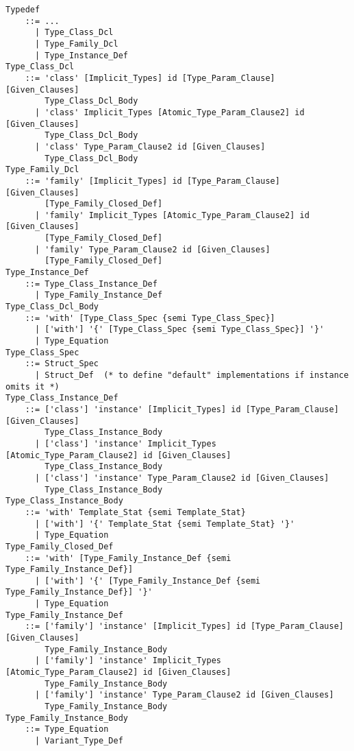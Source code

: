 \grammar\begin{lstlisting}
Typedef
    ::= ...
      | Type_Class_Dcl
      | Type_Family_Dcl
      | Type_Instance_Def
Type_Class_Dcl
    ::= 'class' [Implicit_Types] id [Type_Param_Clause] [Given_Clauses] 
        Type_Class_Dcl_Body
      | 'class' Implicit_Types [Atomic_Type_Param_Clause2] id [Given_Clauses] 
        Type_Class_Dcl_Body
      | 'class' Type_Param_Clause2 id [Given_Clauses] 
        Type_Class_Dcl_Body
Type_Family_Dcl
    ::= 'family' [Implicit_Types] id [Type_Param_Clause] [Given_Clauses]
        [Type_Family_Closed_Def] 
      | 'family' Implicit_Types [Atomic_Type_Param_Clause2] id [Given_Clauses] 
        [Type_Family_Closed_Def] 
      | 'family' Type_Param_Clause2 id [Given_Clauses]
        [Type_Family_Closed_Def] 
Type_Instance_Def
    ::= Type_Class_Instance_Def
      | Type_Family_Instance_Def
Type_Class_Dcl_Body 
    ::= 'with' [Type_Class_Spec {semi Type_Class_Spec}]
      | ['with'] '{' [Type_Class_Spec {semi Type_Class_Spec}] '}'
      | Type_Equation
Type_Class_Spec
    ::= Struct_Spec
      | Struct_Def  (* to define "default" implementations if instance omits it *)
Type_Class_Instance_Def
    ::= ['class'] 'instance' [Implicit_Types] id [Type_Param_Clause] [Given_Clauses] 
        Type_Class_Instance_Body
      | ['class'] 'instance' Implicit_Types [Atomic_Type_Param_Clause2] id [Given_Clauses] 
        Type_Class_Instance_Body
      | ['class'] 'instance' Type_Param_Clause2 id [Given_Clauses] 
        Type_Class_Instance_Body
Type_Class_Instance_Body 
    ::= 'with' Template_Stat {semi Template_Stat}
      | ['with'] '{' Template_Stat {semi Template_Stat} '}'
      | Type_Equation
Type_Family_Closed_Def
    ::= 'with' [Type_Family_Instance_Def {semi Type_Family_Instance_Def}]
      | ['with'] '{' [Type_Family_Instance_Def {semi Type_Family_Instance_Def}] '}'
      | Type_Equation
Type_Family_Instance_Def
    ::= ['family'] 'instance' [Implicit_Types] id [Type_Param_Clause] [Given_Clauses]
        Type_Family_Instance_Body
      | ['family'] 'instance' Implicit_Types [Atomic_Type_Param_Clause2] id [Given_Clauses] 
        Type_Family_Instance_Body
      | ['family'] 'instance' Type_Param_Clause2 id [Given_Clauses]
        Type_Family_Instance_Body
Type_Family_Instance_Body
    ::= Type_Equation
      | Variant_Type_Def
\end{lstlisting}



























